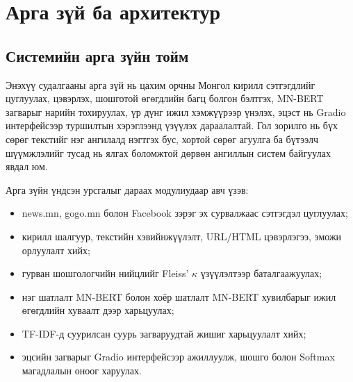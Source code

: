 
\chapter{Арга зүй ба архитектур}
\label{Chapter3}

\section{Системийн арга зүйн тойм}

Энэхүү судалгааны арга зүй нь цахим орчны Монгол кирилл сэтгэгдлийг цуглуулах,
цэвэрлэх, шошготой өгөгдлийн багц болгон бэлтгэх, MN-BERT загварыг нарийн
тохируулах, үр дүнг ижил хэмжүүрээр үнэлэх, эцэст нь Gradio интерфейсээр
туршилтын хэрэглээнд үзүүлэх дараалалтай. Гол зорилго нь бүх сөрөг текстийг нэг
ангилалд нэгтгэх бус, хортой сөрөг агуулга ба бүтээлч шүүмжлэлийг тусад нь
ялгах боломжтой дөрвөн ангиллын систем байгуулах явдал юм.

Арга зүйн үндсэн урсгалыг дараах модулиудаар авч үзэв:

\begin{itemize}
  \item news.mn, gogo.mn болон Facebook зэрэг эх сурвалжаас сэтгэгдэл цуглуулах;
  \item кирилл шалгуур, текстийн хэвийнжүүлэлт, URL/HTML цэвэрлэгээ, эможи орлуулалт хийх;
  \item гурван шошгологчийн нийцлийг Fleiss' $\kappa$ үзүүлэлтээр баталгаажуулах;
  \item нэг шатлалт MN-BERT болон хоёр шатлалт MN-BERT хувилбарыг ижил
        өгөгдлийн хуваалт дээр харьцуулах;
  \item TF-IDF-д суурилсан суурь загваруудтай жишиг харьцуулалт хийх;
  \item эцсийн загварыг Gradio интерфейсээр ажиллуулж, шошго болон Softmax
        магадлалын оноог харуулах.
\end{itemize}

